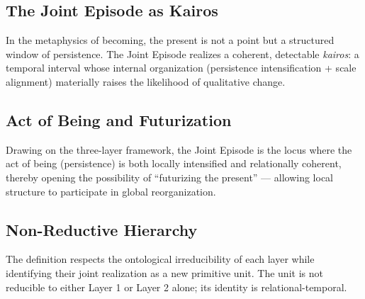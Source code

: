 \subsection{The Joint Episode as Kairos}

In the metaphysics of becoming, the present is not a point but a structured window of persistence. The Joint Episode realizes a coherent, detectable \textit{kairos}: a temporal interval whose internal organization (persistence intensification + scale alignment) materially raises the likelihood of qualitative change.

\subsection{Act of Being and Futurization}

Drawing on the three-layer framework, the Joint Episode is the locus where the act of being (persistence) is both locally intensified and relationally coherent, thereby opening the possibility of “futurizing the present” — allowing local structure to participate in global reorganization.

\subsection{Non-Reductive Hierarchy}

The definition respects the ontological irreducibility of each layer while identifying their joint realization as a new primitive unit. The unit is not reducible to either Layer 1 or Layer 2 alone; its identity is relational-temporal.
